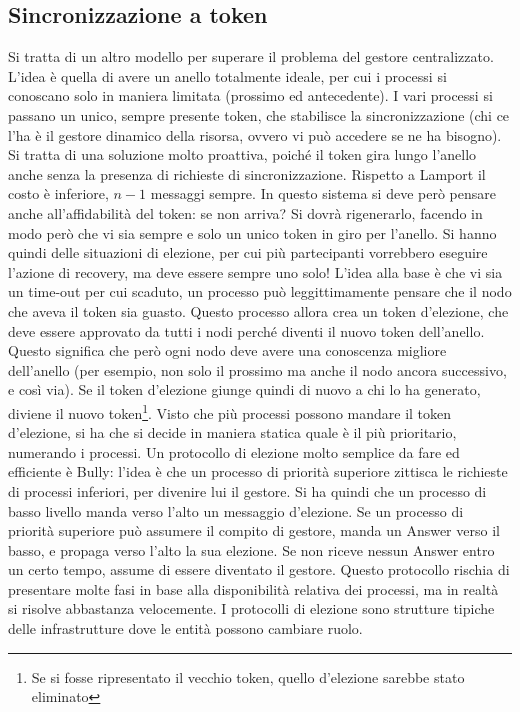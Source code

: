 \subsection{Sincronizzazione a token}
Si tratta di un altro modello per superare il problema del gestore centralizzato. L'idea è quella di avere un anello
totalmente ideale, per cui i processi si conoscano solo in maniera limitata (prossimo ed antecedente). I vari processi si passano un unico, sempre presente token, che stabilisce la sincronizzazione (chi ce l'ha è il gestore dinamico della risorsa, ovvero vi può accedere se ne ha bisogno). Si tratta di una soluzione molto proattiva, poiché il token gira lungo l'anello anche senza la presenza di richieste di sincronizzazione. Rispetto a Lamport il costo è inferiore,
$n-1$ messaggi sempre.
In questo sistema si deve però pensare anche all'affidabilità del token: se non arriva? Si dovrà rigenerarlo, facendo
in modo però che vi sia sempre e solo un unico token in giro per l'anello. Si hanno quindi delle situazioni di elezione,
per cui più partecipanti vorrebbero eseguire l'azione di recovery, ma deve essere sempre uno solo! L'idea alla base è
che vi sia un time-out per cui scaduto, un processo può leggittimamente pensare che il nodo che aveva il token sia
guasto.
Questo processo allora crea un token d'elezione, che deve essere approvato da tutti i nodi perché diventi il nuovo
token dell'anello. Questo significa che però ogni nodo deve avere una conoscenza migliore dell'anello (per esempio, non
solo il prossimo ma anche il nodo ancora successivo, e così via). Se il token d'elezione giunge quindi di nuovo a chi
lo ha generato, diviene il nuovo token\footnote{Se si fosse ripresentato il vecchio token, quello d’elezione sarebbe
stato eliminato}. Visto che più processi possono mandare il token d'elezione, si ha che si decide in maniera
statica quale è il più prioritario, numerando i processi.
Un protocollo di elezione molto semplice da fare ed efficiente è Bully: l'idea è che un processo di priorità superiore
zittisca le richieste di processi inferiori, per divenire lui il gestore. Si ha quindi che un processo di basso livello
manda verso l'alto un messaggio d'elezione. Se un processo di priorità superiore può assumere il compito di gestore,
manda un Answer verso il basso, e propaga verso l'alto la sua elezione. Se non riceve nessun Answer entro un certo
tempo, assume di essere diventato il gestore. Questo protocollo rischia di presentare molte fasi in base alla
disponibilità relativa dei processi, ma in realtà si risolve abbastanza velocemente. I protocolli di elezione sono
strutture tipiche delle infrastrutture dove le entità possono cambiare ruolo.
